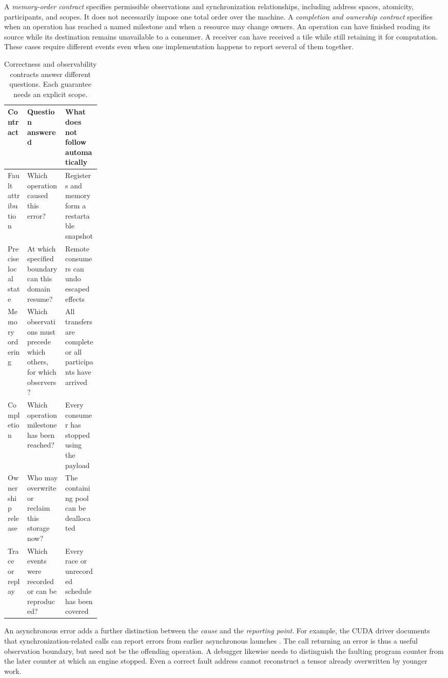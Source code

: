 A \emph{memory-order contract} specifies permissible observations and synchronization relationships, including address spaces, atomicity, participants, and scopes. It does not necessarily impose one total order over the machine. A \emph{completion and ownership contract} specifies when an operation has reached a named milestone and when a resource may change owners. An operation can have finished reading its source while its destination remains unavailable to a consumer. A receiver can have received a tile while still retaining it for computation. These cases require different events even when one implementation happens to report several of them together.

\begin{table}[tbp]
\centering
\small
\begin{tabularx}{\linewidth}{@{}p{0.21\linewidth}XX@{}}
\toprule
Contract & Question answered & What does not follow automatically \\
\midrule
Fault attribution & Which operation caused this error? & Registers and memory form a restartable snapshot \\
Precise local state & At which specified boundary can this domain resume? & Remote consumers can undo escaped effects \\
Memory ordering & Which observations must precede which others, for which observers? & All transfers are complete or all participants have arrived \\
Completion & Which operation milestone has been reached? & Every consumer has stopped using the payload \\
Ownership release & Who may overwrite or reclaim this storage now? & The containing pool can be deallocated \\
Trace or replay & Which events were recorded or can be reproduced? & Every race or unrecorded schedule has been covered \\
\bottomrule
\end{tabularx}
\caption{Correctness and observability contracts answer different questions. Each guarantee needs an explicit scope.}
\label{tab:u007-contracts}
\end{table}

An asynchronous error adds a further distinction between the \emph{cause} and the \emph{reporting point}. For example, the CUDA driver documents that synchronization-related calls can report errors from earlier asynchronous launches \citep{u007_cuda_context}. The call returning an error is thus a useful observation boundary, but need not be the offending operation. A debugger likewise needs to distinguish the faulting program counter from the later counter at which an engine stopped. Even a correct fault address cannot reconstruct a tensor already overwritten by younger work.

